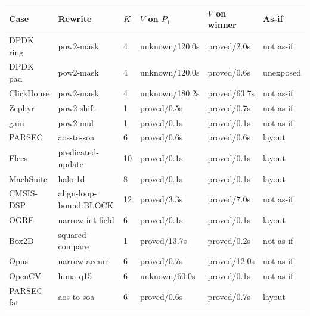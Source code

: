 \begin{center}
\scriptsize
\begin{tabular}{llllll}
\toprule
Case & Rewrite & $K$ & $V$ on $P_1$ & $V$ on winner & As-if \\
\midrule
DPDK ring & pow2-mask & 4 & unknown/120.0s & proved/2.0s & not as-if \\
DPDK pad & pow2-mask & 4 & unknown/120.0s & proved/0.6s & unexposed \\
ClickHouse & pow2-mask & 4 & unknown/180.2s & proved/63.7s & not as-if \\
Zephyr & pow2-shift & 1 & proved/0.5s & proved/0.7s & not as-if \\
gain & pow2-mul & 1 & proved/0.1s & proved/0.1s & not as-if \\
PARSEC & aos-to-soa & 6 & proved/0.6s & proved/0.6s & layout \\
Flecs & predicated-update & 10 & proved/0.1s & proved/0.1s & layout \\
MachSuite & halo-1d & 8 & proved/0.1s & proved/0.1s & layout \\
CMSIS-DSP & align-loop-bound:BLOCK & 12 & proved/3.3s & proved/7.0s & not as-if \\
OGRE & narrow-int-field & 6 & proved/0.1s & proved/0.1s & layout \\
Box2D & squared-compare & 1 & proved/13.7s & proved/0.2s & not as-if \\
Opus & narrow-accum & 6 & proved/0.7s & proved/12.0s & not as-if \\
OpenCV & luma-q15 & 6 & unknown/60.0s & proved/0.1s & not as-if \\
PARSEC fat & aos-to-soa & 6 & proved/0.6s & proved/0.7s & layout \\
\bottomrule
\end{tabular}
\end{center}
